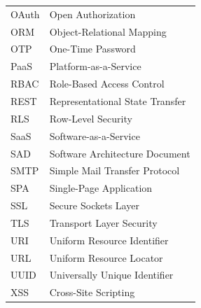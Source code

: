 \begin{longtable}{l p{}}
    OAuth & Open Authorization \\
    ORM & Object-Relational Mapping \\
    OTP & One-Time Password \\
    PaaS & Platform-as-a-Service \\
    RBAC & Role-Based Access Control \\
    REST & Representational State Transfer \\
    RLS & Row-Level Security \\
    SaaS & Software-as-a-Service \\
    SAD & Software Architecture Document \\
    SMTP & Simple Mail Transfer Protocol \\
    SPA & Single-Page Application \\
    SSL & Secure Sockets Layer \\
    TLS & Transport Layer Security \\
    URI & Uniform Resource Identifier \\
    URL & Uniform Resource Locator \\
    UUID & Universally Unique Identifier \\
    XSS & Cross-Site Scripting \\
\end{longtable}
\endgroup
